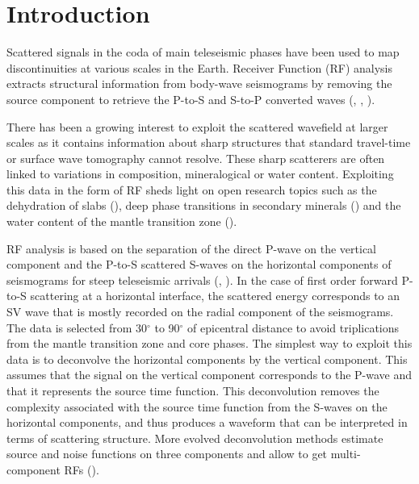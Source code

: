 \documentclass[10pt,a4paper]{article}
\numberwithin{equation}{section}
\begin{document}
\vspace{10mm}

\section{Introduction}

Scattered signals in the coda of main teleseismic phases have been used to map discontinuities at various scales in the Earth.
Receiver Function (RF) analysis extracts structural information from body-wave seismograms by removing the source component to retrieve the P-to-S and S-to-P converted waves (\cite{lang_jgr_79}, \cite{bost_gji_99}, \cite{park_bssa_00}). 

There has been a growing interest to exploit the scattered wavefield at larger scales as it contains information about sharp structures that standard travel-time or surface wave tomography cannot resolve.
These sharp scatterers are often linked to variations in composition, mineralogical or water content.
Exploiting this data in the form of RF sheds light on open research topics such as the dehydration of slabs (\cite{tauz_epsl_17}), deep phase transitions in secondary minerals (\cite{cott_jgr_16}) and the water content of the mantle transition zone (\cite{zhen_sci_07}).

RF analysis is based on the separation of the direct P-wave on the vertical component and the P-to-S scattered S-waves on the horizontal components of seismograms for steep teleseismic arrivals (\cite{phin_jgr_64}, \cite{lang_jgr_79}).
In the case of first order forward P-to-S scattering at a horizontal interface, the scattered energy corresponds to an SV wave that is mostly recorded on the radial component of the seismograms.
The data is selected from 30$^{\circ}$ to 90$^{\circ}$ of epicentral distance to avoid triplications from the mantle transition zone and core phases.
The simplest way to exploit this data is to deconvolve the horizontal components by the vertical component.
This assumes that the signal on the vertical component corresponds to the P-wave and that it represents the source time function.
This deconvolution removes the complexity associated with the source time function from the S-waves on the horizontal components, and thus produces a waveform that can be interpreted in terms of scattering structure.
More evolved deconvolution methods estimate source and noise functions on three components and allow to get multi-component RFs (\cite{chen_gji_10}).
\end{document}
